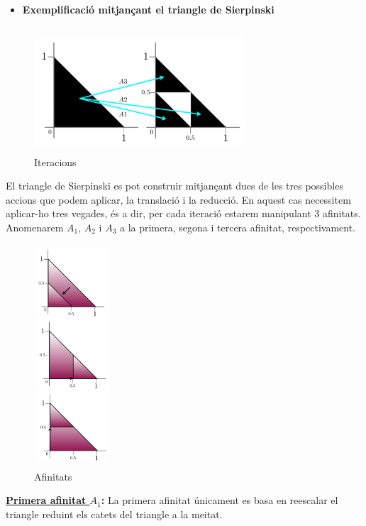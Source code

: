\documentclass[12pt]{report}
\begin{document}
\hspace{-10em} \begin{itemize}
    \item \textbf{Exemplificació mitjançant el triangle de Sierpinski}
\end{itemize} 
\begin{figure}[H]
    \centering
    \includegraphics[width=0.7\textwidth,height=8\normalbaselineskip]{Iteracio1S.PNG}
    \caption{Iteracions}
\end{figure}


El triangle de Sierpinski es pot construir mitjançant dues de les tres possibles accions que podem aplicar, la translació i la reducció. En aquest cas necessitem aplicar-ho tres vegades, és a dir, per cada iteració estarem manipulant 3 afinitats.
\newline
Anomenarem $A_1$, $A_2$ i $A_3$ a la primera, segona i tercera afinitat, respectivament.
\newpage
\begin{figure}
   \centering
    \vspace{-\normalbaselineskip}
    \includegraphics[width=0.25\textwidth,height=20\normalbaselineskip]{AfinitatsS.PNG}
    \caption{Afinitats}
\end{figure}  
\newline
\newline
\textbf{\underline{Primera afinitat $A_1$}:} 
\justifying
La primera afinitat únicament es basa en reescalar el triangle reduint els catets del triangle a la meitat.
\end{document}
